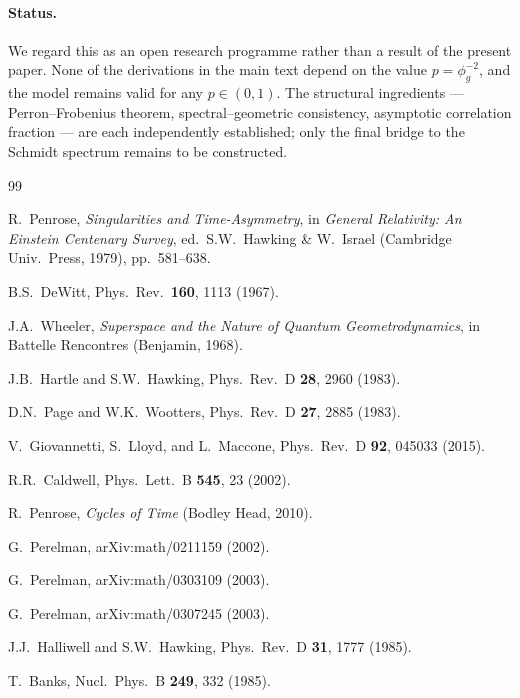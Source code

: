 \documentclass[12pt,a4paper]{article}
\theoremstyle{plain}
\theoremstyle{definition}
\begin{document}
\paragraph{Status.}
We regard this as an open research programme rather than a result of the
present paper.  None of the derivations in the main text depend on the
value $p = \phi_g^{-2}$, and the model remains valid for any $p\in(0,1)$.
The structural ingredients --- Perron--Frobenius theorem, spectral--geometric
consistency, asymptotic correlation fraction --- are each independently
established; only the final bridge to the Schmidt spectrum remains to be
constructed.

\begin{thebibliography}{99}

R.~Penrose,
\textit{Singularities and Time-Asymmetry},
in \textit{General Relativity: An Einstein Centenary Survey},
ed.~S.W.~Hawking \& W.~Israel
(Cambridge Univ.\ Press, 1979), pp.~581--638.

B.S.~DeWitt,
Phys.\ Rev.\ \textbf{160}, 1113 (1967).

J.A.~Wheeler,
\textit{Superspace and the Nature of Quantum Geometrodynamics},
in Battelle Rencontres (Benjamin, 1968).

J.B.~Hartle and S.W.~Hawking,
Phys.\ Rev.\ D \textbf{28}, 2960 (1983).

D.N.~Page and W.K.~Wootters,
Phys.\ Rev.\ D \textbf{27}, 2885 (1983).

V.~Giovannetti, S.~Lloyd, and L.~Maccone,
Phys.\ Rev.\ D \textbf{92}, 045033 (2015).

R.R.~Caldwell,
Phys.\ Lett.\ B \textbf{545}, 23 (2002).

R.~Penrose,
\textit{Cycles of Time}
(Bodley Head, 2010).

G.~Perelman,
arXiv:math/0211159 (2002).

G.~Perelman,
arXiv:math/0303109 (2003).

G.~Perelman,
arXiv:math/0307245 (2003).

J.J.~Halliwell and S.W.~Hawking,
Phys.\ Rev.\ D \textbf{31}, 1777 (1985).

T.~Banks,
Nucl.\ Phys.\ B \textbf{249}, 332 (1985).


\end{thebibliography}
\end{document}
